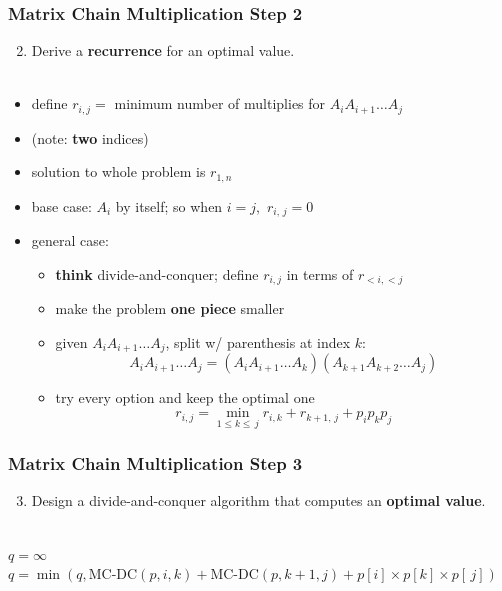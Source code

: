 \documentclass{beamer}
\newcommand{\stanza}{ \\~\ }
\begin{document}
\begin{frame} \frametitle{Matrix Chain Multiplication Step 2}
  \begin{enumerate}
    \setcounter{enumi}{1}
    \item Derive a \textbf{recurrence} for an optimal value.
    \stanza
  \end{enumerate}

  \begin{itemize}
    \item define $r_{i, j} = $ minimum number of multiplies for $A_i A_{i+1} \ldots A_j$
    \item (note: \textbf{two} indices)
    \item solution to whole problem is $r_{1, n}$
    \item base case: $A_i$ by itself; so when $i=j,$ $r_{i,\, j} = 0$
    \item general case:
    \begin{itemize}
      \item \textbf{think} divide-and-conquer; define $r_{i, j}$ in terms of $r_{<i, <j}$
      \item make the problem \textbf{one piece} smaller
      \item given $A_i A_{i+1} \ldots A_j$, split w/ parenthesis at index $k:$
        \[ A_i A_{i+1} \ldots A_j = (A_i A_{i+1} \ldots A_k) (A_{k+1} A_{k+2} \ldots A_j) \]
      \item try every option and keep the optimal one
      \[ r_{i, j} = \min_{1 \leq k \leq \, j} r_{i, k} + r_{k+1, \, j} + p_i p_k p_j \]
    \end{itemize}
  \end{itemize}
\end{frame}
  
\begin{frame} \frametitle{Matrix Chain Multiplication Step 3}
  \begin{enumerate}
    \setcounter{enumi}{2}
    \item Design a divide-and-conquer algorithm that computes an \textbf{optimal value}.
    \stanza
  \end{enumerate}

  {\scriptsize
  \begin{algorithmic}[1]
    \State {}
    \EndFunction
      \State {}
    \EndIf
    \State $q = \infty$
      \State $q = \min(q, \text{MC-DC}(p, i, k) + \text{MC-DC}(p, k+1, j) + p[i] \times p[k] \times p[\, j])$
    \EndFor
    \State {}
    \EndFunction
  \end{algorithmic}
  }
\end{frame}
\end{document}
